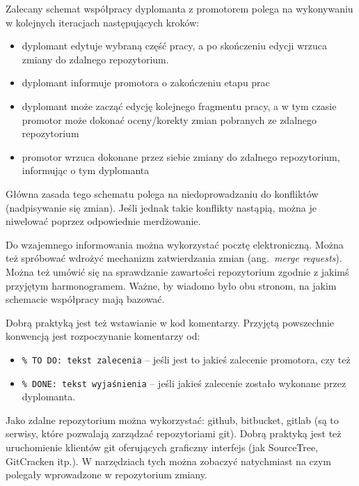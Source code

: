 Zalecany schemat współpracy dyplomanta z promotorem polega na wykonywaniu w kolejnych iteracjach następujących kroków:
\begin{itemize}
\item dyplomant edytuje wybraną część pracy, a po skończeniu edycji wrzuca zmiany do zdalnego repozytorium.
\item dyplomant informuje promotora o zakończeniu etapu prac
\item dyplomant może zacząć edycję kolejnego fragmentu pracy, a w tym czasie promotor może dokonać oceny/korekty zmian pobranych ze zdalnego repozytorium
\item promotor wrzuca dokonane przez siebie zmiany do zdalnego repozytorium, informując o tym dyplomanta\
\end{itemize}
Główna zasada tego schematu polega na niedoprowadzaniu do konfliktów (nadpisywanie się zmian). Jeśli jednak takie konflikty nastąpią, można je niwelować poprzez odpowiednie merdżowanie. 

Do wzajemnego informowania można wykorzystać pocztę elektroniczną. Można też spróbować wdrożyć mechanizm zatwierdzania zmian (ang.~\emph{merge requests}). Można też umówić się na sprawdzanie zawartości repozytorium zgodnie z jakimś przyjętym harmonogramem. Ważne, by wiadomo było obu stronom, na jakim schemacie współpracy mają bazować.

Dobrą praktyką jest też wstawianie w kod komentarzy. Przyjętą powszechnie konwencją jest rozpoczynanie komentarzy od:
\begin{itemize}
\item \verb|% TO DO: tekst zalecenia| 
-- jeśli jest to jakieś zalecenie promotora, czy też 
\item \verb|% DONE: tekst wyjaśnienia| 
-- jeśli jakieś zalecenie zostało wykonane przez dyplomanta. 
\end{itemize}

Jako zdalne repozytorium można wykorzystać: github, bitbucket, gitlab (są to serwisy, które pozwalają zarządzać repozytoriami git).
Dobrą praktyką jest też uruchomienie klientów git oferujących graficzny interfejs (jak SourceTree, GitCracken itp.). W narzędziach tych można zobaczyć natychmiast na czym polegały wprowadzone w repozytorium zmiany. 